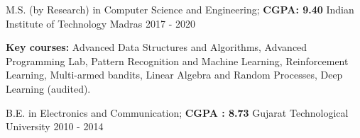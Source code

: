 \documentclass[11pt, a4paper]{awesome-cv}
\begin{document}
\makecvheader[C]



\vspace{-4mm}
\begin{cventries}
	
	\cventry
	{M.S. (by Research) in Computer Science and Engineering; \color{text}\textbf{CGPA: 9.40}}
	{Indian Institute of Technology Madras}
	{2017 - 2020}
	{}
	{
		\begin{cvitems} %
			\item \textbf{Key courses: }Advanced Data Structures and Algorithms, Advanced Programming Lab, Pattern Recognition and Machine Learning, Reinforcement Learning, Multi-armed bandits, Linear Algebra and Random Processes, Deep Learning (audited).
		\end{cvitems}
	}
	
	\cventry
	{B.E. in Electronics and Communication; \color{text}\textbf{CGPA : 8.73}} %
	{Gujarat Technological University}
	{2010 - 2014}
	{}
	{}

\end{cventries}
\vspace{-7mm}
\end{document}

